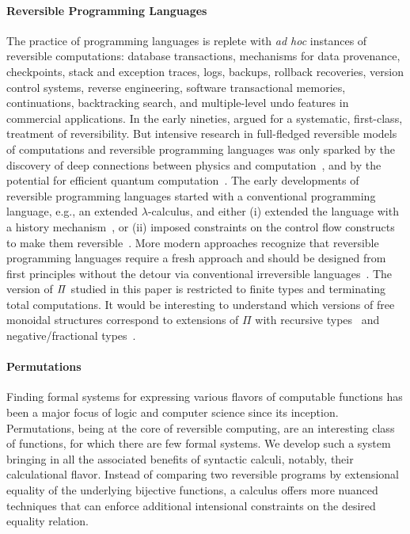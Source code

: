 \paragraph{Reversible Programming Languages} The practice of programming languages is replete with \emph{ad hoc}
instances of reversible computations: database transactions, mechanisms for data provenance, checkpoints, stack and
exception traces, logs, backups, rollback recoveries, version control systems, reverse engineering, software
transactional memories, continuations, backtracking search, and multiple-level undo features in commercial
applications. In the early nineties, \citet{Baker:1992:LLL,Baker:1992:NFT} argued for a systematic, first-class,
treatment of reversibility. But intensive research in full-fledged reversible models of computations and reversible
programming languages was only sparked by the discovery of deep connections between physics and
computation~\cite{Landauer:1961,PhysRevA.32.3266,Toffoli:1980,bennett1985fundamental,Frank:1999:REC:930275,Hey:1999:FCE:304763,fredkin1982conservative},
and by the potential for efficient quantum computation~\cite{springerlink:10.1007/BF02650179}. The early developments of
reversible programming languages started with a conventional programming language, e.g., an extended $\lambda$-calculus,
and either (i) extended the language with a history
mechanism~\cite{vanTonder:2004,Kluge:1999:SEMCD,lorenz,danos2004reversible}, or (ii) imposed constraints on the control
flow constructs to make them reversible~\cite{Yokoyama:2007:RPL:1244381.1244404}.  More modern approaches recognize that
reversible programming languages require a fresh approach and should be designed from first principles without the
detour via conventional irreversible
languages~\cite{Yokoyama:2008:PRP,Mu:2004:ILRC,abramsky2005structural,DiPierro:2006:RCL:1166042.1166047}. The version of
$\mathit{\Pi}$ studied in this paper is restricted to finite types and terminating total computations. It would be
interesting to understand which versions of free monoidal structures correspond to extensions of $\Pi$ with recursive
types~\cite{jamesInformationEffects2012,rc2011} and negative/fractional
types~\cite{chenComputationalInterpretationCompact2021}.

\paragraph{Permutations} Finding formal systems for expressing various flavors of computable functions has been a major
focus of logic and computer science since its inception. Permutations, being at the core of reversible computing, are an
interesting class of functions, for which there are few formal systems. We develop such a system bringing in all the
associated benefits of syntactic calculi, notably, their calculational flavor. Instead of comparing two reversible
programs by extensional equality of the underlying bijective functions, a calculus offers more nuanced techniques that
can enforce additional intensional constraints on the desired equality relation.


